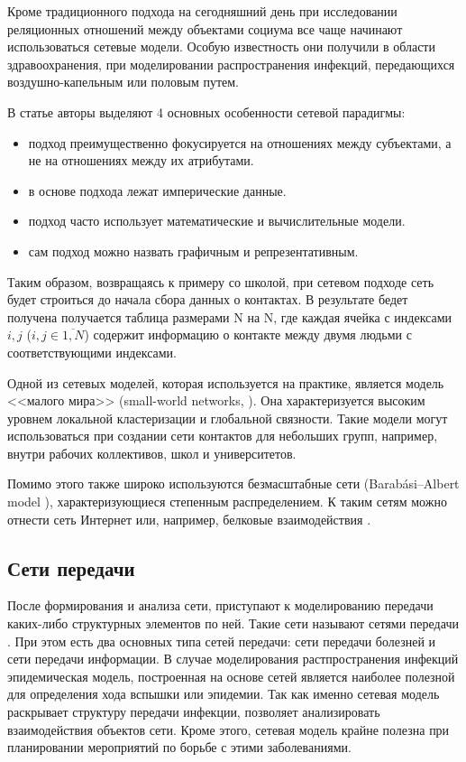 \documentclass[14pt,a4paper]{article}
\begin{document}
Кроме традиционного подхода на сегодняшний день при исследовании реляционных отношений между объектами социума все чаще начинают использоваться сетевые модели. Особую известность они получили в области здравоохранения, при моделировании распространения инфекций, передающихся воздушно-капельным или половым путем.

В статье \cite{Luke} авторы выделяют 4 основных особенности сетевой парадигмы:
\begin{itemize}
	\item подход преимущественно фокусируется на отношениях между субъектами, а не на отношениях между их атрибутами.
	
	\item в основе подхода лежат имперические данные.

	\item подход часто использует математические и вычислительные модели.
	
	\item сам подход можно назвать графичным и репрезентативным.
\end{itemize}

Таким образом, возвращаясь к примеру со школой, при сетевом подходе сеть будет строиться до начала сбора данных о контактах. В результате бедет получена получается таблица размерами N на N, где каждая ячейка с индексами $i, j$ ($i, j \in \overline{1, N}$) содержит информацию о контакте между двумя людьми с соответствующими индексами. 

Одной из сетевых моделей, которая используется на практике, является модель <<малого мира>> (small-world networks, \cite{Watts}). Она характеризуется высоким уровнем локальной кластеризации и глобальной связности. Такие модели могут использоваться при создании сети контактов для небольших групп, например, внутри рабочих коллективов, школ и университетов.

Помимо этого также широко используются безмасштабные сети (Barabási–Albert model \cite{BA}), характеризующиеся степенным распределением.
К таким сетям можно отнести сеть Интернет \cite{www} или, например, белковые взаимодействия \cite{Wuchty}.

\subsection{Сети передачи}

После формирования и анализа сети, приступают к моделированию передачи каких-либо структурных элементов по ней. Такие сети называют сетями передачи \cite{network_analysis}. При этом есть два основных типа сетей передачи: сети передачи болезней и сети передачи информации. В случае моделирования растпространения инфекций эпидемическая модель, построенная на основе сетей является наиболее полезной для определения хода вспышки или эпидемии. Так как именно сетевая модель раскрывает структуру передачи инфекции, позволяет анализировать взаимодействия объектов сети. Кроме этого, сетевая модель крайне полезна при планировании мероприятий по борьбе с этими заболеваниями.  
\end{document}
